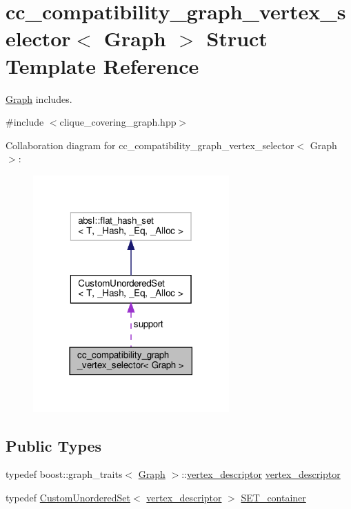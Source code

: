 \hypertarget{structcc__compatibility__graph__vertex__selector}{}\section{cc\+\_\+compatibility\+\_\+graph\+\_\+vertex\+\_\+selector$<$ Graph $>$ Struct Template Reference}
\label{structcc__compatibility__graph__vertex__selector}


\hyperlink{structGraph}{Graph} includes.  




{\ttfamily \#include $<$clique\+\_\+covering\+\_\+graph.\+hpp$>$}



Collaboration diagram for cc\+\_\+compatibility\+\_\+graph\+\_\+vertex\+\_\+selector$<$ Graph $>$\+:
\nopagebreak
\begin{figure}[H]
\begin{center}
\leavevmode
\includegraphics[width=213pt]{d9/d6b/structcc__compatibility__graph__vertex__selector__coll__graph}
\end{center}
\end{figure}
\subsection*{Public Types}
\begin{DoxyCompactItemize}
\item 
typedef boost\+::graph\+\_\+traits$<$ \hyperlink{structGraph}{Graph} $>$\+::\hyperlink{structcc__compatibility__graph__vertex__selector_a445b79c6570f741f69230996f98df72b}{vertex\+\_\+descriptor} \hyperlink{structcc__compatibility__graph__vertex__selector_a445b79c6570f741f69230996f98df72b}{vertex\+\_\+descriptor}
\item 
typedef \hyperlink{classCustomUnorderedSet}{Custom\+Unordered\+Set}$<$ \hyperlink{structcc__compatibility__graph__vertex__selector_a445b79c6570f741f69230996f98df72b}{vertex\+\_\+descriptor} $>$ \hyperlink{structcc__compatibility__graph__vertex__selector_abe217f0679bd4c93a9492844634d4e82}{S\+E\+T\+\_\+container}
\end{DoxyCompactItemize}

